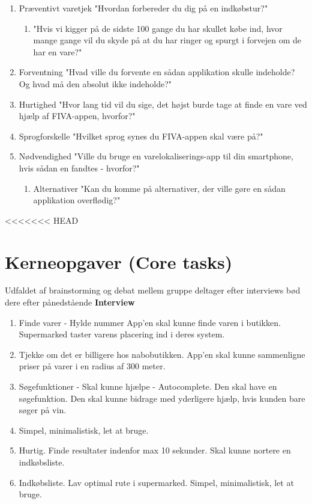 \documentclass[12pt]{article}
\begin{document}
\begin{enumerate}
\item Præventivt varetjek "Hvordan forbereder du dig på en indkøbstur?"

\begin{enumerate}
\item "Hvis vi kigger på de sidste 100 gange du har skullet købe ind, hvor mange gange vil du skyde på at du har ringer og spurgt i forvejen om de har en vare?"
\end{enumerate}

\item Forventning "Hvad ville du forvente en sådan applikation skulle indeholde? Og hvad må den absolut ikke indeholde?"
\item Hurtighed	"Hvor lang tid vil du sige, det højst burde tage at finde en vare ved hjælp af FIVA-appen, hvorfor?"
\item Sprogforskelle "Hvilket sprog synes du FIVA-appen skal være på?"
\item Nødvendighed "Ville du bruge en varelokaliserings-app til din smartphone, hvis sådan en fandtes - hvorfor?"

\begin{enumerate}
\item Alternativer "Kan du komme på alternativer, der ville gøre en sådan applikation overflødig?"
\end{enumerate}

\end{enumerate}

<<<<<<< HEAD
\section*{Kerneopgaver (Core tasks)}
Udfaldet af brainstorming og debat mellem gruppe deltager efter interviews b\o d dere efter p\aa nedst\aa ende  
\textbf{Interview}\\

\begin{enumerate}
\item Finde varer - Hylde nummer App'en skal kunne finde varen i butikken. Supermarked taster varens placering ind i deres system.
\item Tjekke om det er billigere hos nabobutikken. App'en skal kunne sammenligne priser på varer i en radius af 300 meter.
\item Søgefunktioner - Skal kunne hjælpe - Autocomplete. Den skal have en søgefunktion. Den skal kunne bidrage med yderligere hjælp, 
hvis kunden bare søger på vin. 
\item Simpel, minimalistisk, let at bruge.
\item Hurtig. Finde resultater indenfor max 10 sekunder. Skal kunne nortere en indkøbsliste.
\item Indkøbsliste. Lav optimal rute i supermarked. Simpel, minimalistisk, let at bruge. 
\end{enumerate}
\end{document}
